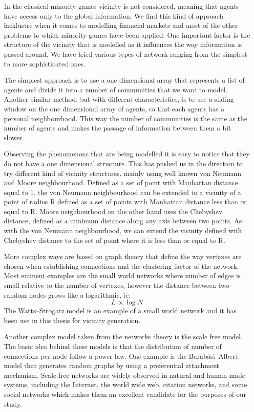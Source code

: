 In the classical minority games vicinity is not considered, meaning that agents have access only to the global information.
We find this kind of approach lacklustre when it comes to modelling financial markets and most of the other problems to which minority games have been applied.
One important factor is the structure of the vicinity that is modelled as it influences the way information is passed around.
We have tried various types of network ranging from the simplest to more sophisticated ones.

The simplest approach is to use a one dimensional array that represents a list of agents and divide it into a number of communities that we want to model.
Another similar method, but with different characteristics, is to use a sliding window on the one dimensional array of agents, so that each agents has a personal neighbourhood.
This way the number of communities is the same as the number of agents and makes the passage of information between them a bit slower.

Observing the phenomenons that are being modelled it is easy to notice that they do not have a one dimensional structure.
This has pushed us in the direction to try different kind of vicinity structures, mainly using well known von Neumann and Moore neighbourhood.
Defined as a set of point with Manhattan distance equal to 1, the von Neumann neighbourhood can be extended to a vicinity of a point of radius R defined as a set of points with Manhattan distance less than or equal to R.
Moore neighbourhood on the other hand uses the Chebyshev distance, defined as a minimum distance along any axis between two points.
As with the von Neumann neighbourhood, we can extend the vicinity defined with Chebyshev distance to the set of point where it is less than or equal to R.

More complex ways are based on graph theory that define the way vertexes are chosen when establishing connections and the clustering factor of the network.
Most eminent examples are the small world networks where number of edges is small relative to the number of vertexes, however the distance between two random nodes grows like a logarithmic, ie.
\begin{displaymath}
L\propto \log N
\end{displaymath}
The Watts–Strogatz model is an example of a small world network and it has been use in this thesis for vicinity generation.

Another complex model taken from the networks theory is the scale free model. 
The basic idea behind these models is that the distribution of number of connections per node follow a power law.
One example is the Barabási–Albert model that generates random graphs by using a preferential attachment mechanism.
Scale-free networks are widely observed in natural and human-made systems, including the Internet, the world wide web, citation networks, and some social networks which makes them an excellent candidate for the purposes of our study.

